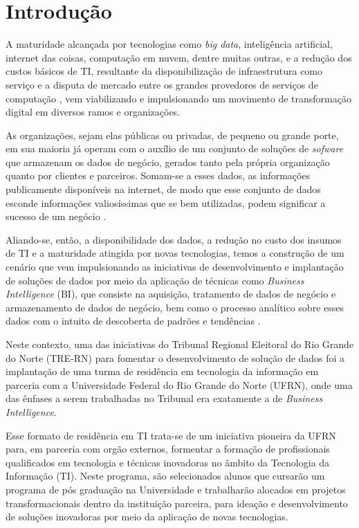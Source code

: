 
\section{Introdução}
A maturidade alcançada por tecnologias como \textit{big data}, inteligência artificial, internet das coisas, computação em nuvem, dentre muitas outras, e a redução dos custos básicos de TI, resultante da disponibilização de infraestrutura como serviço e a disputa de mercado entre os grandes provedores de serviços de computação \cite{infraPriceDrop}, vem viabilizando e impulsionando um movimento de transformação digital em diversos ramos e organizações.

As organizações, sejam elas públicas ou privadas, de pequeno ou grande porte, em sua maioria já operam com o auxílio de um conjunto de soluções de \textit{sofware} que armazenam os dados de negócio, gerados tanto pela própria organização quanto por clientes e parceiros. Somam-se a esses dados, as informações publicamente disponíveis na internet, de modo que esse conjunto de dados esconde informações valiosíssimas que se bem utilizadas, podem significar a sucesso de um negócio \cite{digitalization}. 

Aliando-se, então, a disponibilidade dos dados, a redução no custo dos insumos de TI e a maturidade atingida por novas tecnologias, temos a construção de um cenário que vem impulsionando as iniciativas de desenvolvimento e implantação de soluções de dados por meio da aplicação de técnicas como \textit{Business Intelligence} (BI), que consiste na aquisição, tratamento de dados de negócio e armazenamento de dados de negócio, bem como o processo analítico sobre esses dados com o intuito de descoberta de padrões e tendências \cite{BIDef}.

Neste contexto, uma das iniciativas do Tribunal Regional Eleitoral do Rio Grande do Norte (TRE-RN) para fomentar o desenvolvimento de solução de dados foi a implantação de uma turma de residência em tecnologia da informação em parceria com a Universidade Federal do Rio Grande do Norte (UFRN), onde uma das ênfases a serem trabalhadas no Tribunal era exatamente a de \textit{Business Intelligence}. 

Esse formato de residência em TI trata-se de um iniciativa pioneira da UFRN para, em parceria com orgão externos, formentar a formação de profissionais qualificados em tecnologia e técnicas inovadoras no âmbito da Tecnologia da Informação (TI). Neste programa, são selecionados alunos que cursarão um programa de pós graduação na Universidade e trabalharão alocados em projetos transformacionais dentro da instituição parceira, para ideação e desenvolvimento de soluções inovadoras por meio da aplicação de novas tecnologias.

